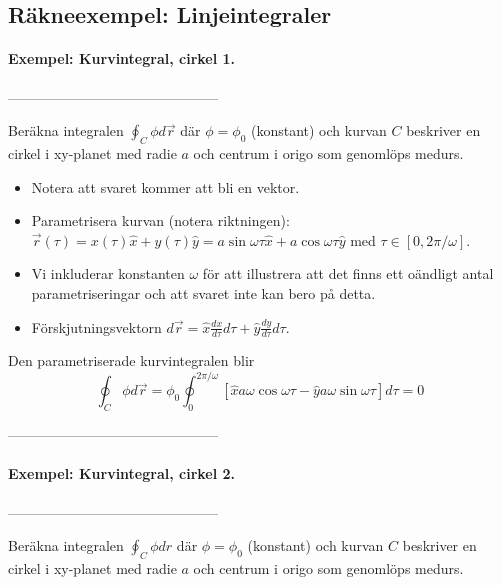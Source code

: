 \documentclass[%
oneside,                 %
final,                   %
10pt]{article}
\begin{document}
\subsection{Räkneexempel: Linjeintegraler}

\paragraph{Exempel: Kurvintegral, cirkel 1.}
---------------------------------------------

Beräkna integralen $\oint_C \phi d\vec{r}$ där $\phi = \phi_0$ (konstant) och kurvan $C$ beskriver en cirkel i xy-planet med radie $a$ och centrum i origo som genomlöps medurs.

\begin{itemize}
\item Notera att svaret kommer att bli en vektor.

\item Parametrisera kurvan (notera riktningen): $\vec{r}(\tau) = x(\tau)\hat{x} + y(\tau)\hat{y} = a \sin\omega\tau \hat{x} + a \cos\omega\tau \hat{y}$ med $\tau \in [0,2\pi/\omega]$.

\item Vi inkluderar konstanten $\omega$ för att illustrera att det finns ett oändligt antal parametriseringar och att svaret inte kan bero på detta.

\item Förskjutningsvektorn $d\vec{r} = \hat{x} \frac{dx}{d\tau}d\tau + \hat{y} \frac{dy}{d\tau}d\tau$.
\end{itemize}

\noindent
Den parametriserade kurvintegralen blir
\begin{equation}
\oint_C \phi d\vec{r} = \phi_0 \oint_0^{2\pi/\omega} \left[
\hat{x} a \omega\cos\omega\tau - \hat{y} a \omega\sin\omega\tau \right] d\tau = 0
\end{equation}

---------------------------------------------

\paragraph{Exempel: Kurvintegral, cirkel 2.}
---------------------------------------------

Beräkna integralen $\oint_C \phi dr$ där $\phi = \phi_0$ (konstant) och kurvan $C$ beskriver en cirkel i xy-planet med radie $a$ och centrum i origo som genomlöps medurs.
\end{document}
